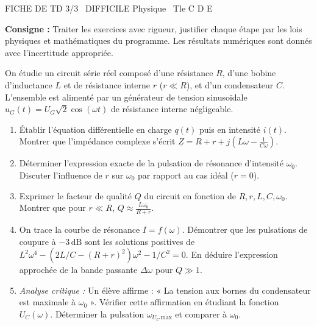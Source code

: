 \documentclass[11pt]{article}
\begin{document}
\begin{tcolorbox}[enhanced,colback=popink,colframe=popink,arc=10pt,boxrule=0pt,left=12pt,right=12pt,top=9pt,bottom=9pt]
{\color{white}\popxbold\small FICHE DE TD 3/3 \textbullet\ DIFFICILE \hfill Physique \textbullet\ Tle C D E\par}
\end{tcolorbox}
\vspace{4pt}
\noindent \textbf{Consigne :} Traiter les exercices avec rigueur, justifier chaque étape par les lois physiques et mathématiques du programme. Les résultats numériques sont donnés avec l'incertitude appropriée.

\begin{exercice}
On étudie un circuit série réel composé d'une résistance $R$, d'une bobine d'inductance $L$ et de résistance interne $r$ ($r \ll R$), et d'un condensateur $C$. L'ensemble est alimenté par un générateur de tension sinusoïdale $u_G(t) = U_G\sqrt{2}\cos(\omega t)$ de résistance interne négligeable.
\begin{enumerate}
    \item Établir l'équation différentielle en charge $q(t)$ puis en intensité $i(t)$. Montrer que l'impédance complexe s'écrit $\underline{Z} = R+r + j\left(L\omega - \frac{1}{C\omega}\right)$.
    \item Déterminer l'expression exacte de la pulsation de résonance d'intensité $\omega_0$. Discuter l'influence de $r$ sur $\omega_0$ par rapport au cas idéal ($r=0$).
    \item Exprimer le facteur de qualité $Q$ du circuit en fonction de $R, r, L, C, \omega_0$. Montrer que pour $r \ll R$, $Q \approx \frac{L\omega_0}{R+r}$.
    \item On trace la courbe de résonance $I = f(\omega)$. Démontrer que les pulsations de coupure à $-3\,\text{dB}$ sont les solutions positives de $L^2\omega^4 - (2L/C - (R+r)^2)\omega^2 - 1/C^2 = 0$. En déduire l'expression approchée de la bande passante $\Delta\omega$ pour $Q \gg 1$.
    \item \textit{Analyse critique :} Un élève affirme : « La tension aux bornes du condensateur est maximale à $\omega_0$ ». Vérifier cette affirmation en étudiant la fonction $U_C(\omega)$. Déterminer la pulsation $\omega_{U_C\,\text{max}}$ et comparer à $\omega_0$.
\end{enumerate}
\end{exercice}
\end{document}
